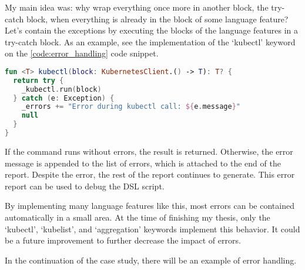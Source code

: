 My main idea was: why wrap everything once more in another block, the try-catch block, when everything is already in the block of some language feature? Let's contain the exceptions by executing the blocks of the language features in a try-catch block. As an example, see the implementation of the `kubectl' keyword on the \ref{code:error_handling} code snippet.

\begin{lstlisting}[caption={kubectl error handling implementation},language=Kotlin,label=code:error_handling]
fun <T> kubectl(block: KubernetesClient.() -> T): T? {
  return try {
    _kubectl.run(block)
  } catch (e: Exception) {
    _errors += "Error during kubectl call: ${e.message}"
    null
  }
}
\end{lstlisting}

If the command runs without errors, the result is returned. Otherwise, the error message is appended to the list of errors, which is attached to the end of the report. Despite the error, the rest of the report continues to generate. This error report can be used to debug the DSL script.

By implementing many language features like this, most errors can be contained automatically in a small area. At the time of finishing my thesis, only the `kubectl', `kubelist', and `aggregation' keywords implement this behavior. It could be a future improvement to further decrease the impact of errors.

In the continuation of the case study, there will be an example of error handling.
